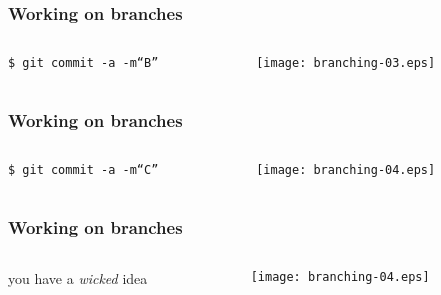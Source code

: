 \documentclass[english]{beamer}
\newcommand{\CMD}[1]{%
\texttt{\textcolor{code-green}{#1}}%
}
\begin{document}
\begin{frame}
\frametitle{Working on branches}

\begin{columns}[t]
        \begin{column}[T]{.5\textwidth}
                {\small
                \CMD{\$ git commit -a -m``B''} \\
                }
        \end{column}
        \begin{column}[T]{.5\textwidth}
                \texttt{[image: branching-03.eps]}
        \end{column}
\end{columns}
\end{frame}

\begin{frame}
\frametitle{Working on branches}

\begin{columns}[t]
        \begin{column}[T]{.5\textwidth}
                {\small
                \CMD{\$ git commit -a -m``C''} \\
                }
        \end{column}
        \begin{column}[T]{.5\textwidth}
                \texttt{[image: branching-04.eps]}
        \end{column}
\end{columns}
\end{frame}

\begin{frame}
\frametitle{Working on branches}

\begin{columns}[t]
        \begin{column}[T]{.5\textwidth}
                you have a {\em wicked} idea
        \end{column}
        \begin{column}[T]{.5\textwidth}
                \texttt{[image: branching-04.eps]}
        \end{column}
\end{columns}
\end{frame}
\end{document}
